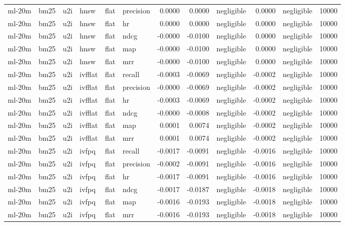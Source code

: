 \begin{tabular}{llllllrrlrlr}
ml-20m & bm25 & u2i & hnsw & flat & precision & 0.0000 & 0.0000 & negligible & 0.0000 & negligible & 10000 \\
ml-20m & bm25 & u2i & hnsw & flat & hr & 0.0000 & 0.0000 & negligible & 0.0000 & negligible & 10000 \\
ml-20m & bm25 & u2i & hnsw & flat & ndcg & -0.0000 & -0.0100 & negligible & 0.0000 & negligible & 10000 \\
ml-20m & bm25 & u2i & hnsw & flat & map & -0.0000 & -0.0100 & negligible & 0.0000 & negligible & 10000 \\
ml-20m & bm25 & u2i & hnsw & flat & mrr & -0.0000 & -0.0100 & negligible & 0.0000 & negligible & 10000 \\
ml-20m & bm25 & u2i & ivfflat & flat & recall & -0.0003 & -0.0069 & negligible & -0.0002 & negligible & 10000 \\
ml-20m & bm25 & u2i & ivfflat & flat & precision & -0.0000 & -0.0069 & negligible & -0.0002 & negligible & 10000 \\
ml-20m & bm25 & u2i & ivfflat & flat & hr & -0.0003 & -0.0069 & negligible & -0.0002 & negligible & 10000 \\
ml-20m & bm25 & u2i & ivfflat & flat & ndcg & -0.0000 & -0.0008 & negligible & -0.0002 & negligible & 10000 \\
ml-20m & bm25 & u2i & ivfflat & flat & map & 0.0001 & 0.0074 & negligible & -0.0002 & negligible & 10000 \\
ml-20m & bm25 & u2i & ivfflat & flat & mrr & 0.0001 & 0.0074 & negligible & -0.0002 & negligible & 10000 \\
ml-20m & bm25 & u2i & ivfpq & flat & recall & -0.0017 & -0.0091 & negligible & -0.0016 & negligible & 10000 \\
ml-20m & bm25 & u2i & ivfpq & flat & precision & -0.0002 & -0.0091 & negligible & -0.0016 & negligible & 10000 \\
ml-20m & bm25 & u2i & ivfpq & flat & hr & -0.0017 & -0.0091 & negligible & -0.0016 & negligible & 10000 \\
ml-20m & bm25 & u2i & ivfpq & flat & ndcg & -0.0017 & -0.0187 & negligible & -0.0018 & negligible & 10000 \\
ml-20m & bm25 & u2i & ivfpq & flat & map & -0.0016 & -0.0193 & negligible & -0.0018 & negligible & 10000 \\
ml-20m & bm25 & u2i & ivfpq & flat & mrr & -0.0016 & -0.0193 & negligible & -0.0018 & negligible & 10000 \\
\bottomrule
\end{tabular}
